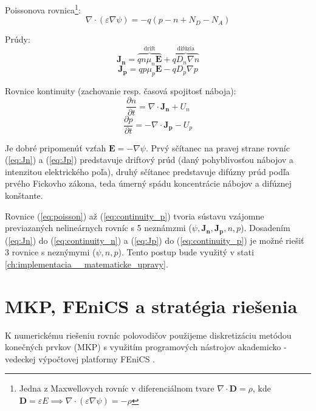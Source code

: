 \documentclass{eeict}
\newcommand{\dxdtp}[2]{\frac{\partial #1}{\partial #2}}
\begin{document}
Poissonova rovnica\footnote{Jedna z Maxwellovych rovníc v diferenciálnom tvare \mbox{$\nabla \cdot \mathbf{D} = \rho$}, kde \mbox{$\mathbf{D} = \varepsilon E \implies \nabla \cdot (\varepsilon \nabla \psi) = - \rho$}}:
\begin{equation}
	\nabla \cdot (\varepsilon \nabla \psi) = -q (p -n + N_D - N_A)
	\label{eq:poisson}
\end{equation}

Prúdy:
\begin{equation}
	\mathbf{J_n} = \overbrace{q n \mu_n \mathbf{E}}^\text{drift} + \overbrace{q D_n \nabla n}^\text{difúzia}
	\label{eq:Jn}
\end{equation}
\begin{equation}
	\mathbf{J_p} = q p \mu_p \mathbf{E} - q D_p \nabla p
	\label{eq:Jp}
\end{equation}

Rovnice kontinuity (zachovanie resp. časová spojitosť náboja):
\begin{equation}
	\dxdtp{n}{t} = \nabla \cdot \mathbf{J_n} + U_n
	\label{eq:continuity_n}
\end{equation}
\begin{equation}
	\dxdtp{p}{t} = -\nabla \cdot \mathbf{J_p} - U_p
	\label{eq:continuity_p}
\end{equation}

Je dobré pripomenúť vzťah $\mathbf{E} = - \nabla \psi$. Prvý sčítanec na pravej strane rovníc (\ref{eq:Jn}) a (\ref{eq:Jp}) predstavuje driftový prúd (daný pohyblivosťou nábojov a intenzitou elektrického poľa), druhý sčítanec predstavuje difúzny prúd podľa prvého Fickovho zákona, teda úmerný spádu koncentrácie nábojov a difúznej konštante.

Rovnice (\ref{eq:poisson}) až (\ref{eq:continuity_p}) tvoria sústavu vzájomne previazaných nelineárnych rovníc s 5 neznámzmi ($\psi, \mathbf{J_n}, \mathbf{J_p}, n, p$). Dosadením (\ref{eq:Jn}) do (\ref{eq:continuity_n}) a (\ref{eq:Jp}) do (\ref{eq:continuity_p}) je možné riešiť 3 rovnice s neznýmymi ($\psi, n, p$). Tento postup bude využitý v stati \ref{ch:implementacia__matematicke_upravy}.


\section{MKP, FEniCS a stratégia riešenia}
K numerickému riešeniu rovníc polovodičov použijeme diskretizáciu metódou konečných prvkov (MKP) s využitím programových nástrojov akademicko - vedeckej výpočtovej platformy FEniCS \cite{fenicsproject}.
\end{document}

